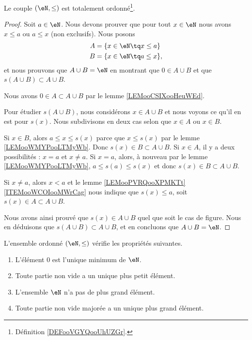 \begin{proposition}     \label{PROPooGCCRooFBYrlo}
	Le couple \( (\eN,\leq)\) est totalement ordonné\footnote{Définition \ref{DEFooVGYQooUhUZGr}.}.
\end{proposition}

\begin{proof}
	Soit \( a\in \eN\). Nous devons prouver que pour tout \( x\in \eN\) nous avons \( x\leq a\) ou \( a\leq x\) (non exclusifs). Nous posons
	\begin{subequations}
		\begin{align}
			A & =\{ x\in \eN\tq x\leq a \}  \\
			B & =\{ x\in \eN\tq a\leq x \},
		\end{align}
	\end{subequations}
	et nous prouvons que \( A\cup B=\eN\) en montrant que \( 0\in A\cup B\) et que \( s(A\cup B)\subset A\cup B\).

	Nous avons \( 0\in A\subset A\cup B\) par le lemme \ref{LEMooCSIXooHeuWEd}.

	Pour étudier \( s(A\cup B)\), nous considérons \( x\in A\cup B\) et nous voyons ce qu'il en est pour \( s(x) \). Nous subdivisons en deux cas selon que \( x\in A\) ou \( x\in B\).

	\begin{subproof}
		\spitem[Si \( x\in B\)]
		Si \( x\in B\), alors \( a\leq x\leq s(x)\) parce que \( x\leq s(x)\) par le lemme \ref{LEMooWMYPooLTMyWb}. Donc \( s(x)\in B\subset A\cup B\).
		\spitem[Si \( x\in A\)]
		Si \( x\in A\), il y a deux possibilités : \( x=a\) et \( x\neq a\). Si \( x=a\), alors, à nouveau par le lemme \ref{LEMooWMYPooLTMyWb}, \( a\leq s(a) \leq s(x) \) et donc \( s(x)\in B\subset A\cup B\).

		Si \( x\neq a\), alors \( x < a \) et le lemme \ref{LEMooPVRQooXPMKTt}\ref{ITEMooWCOIooMWrCag} nous indique que \( s(x)\leq a\), soit \( s(x)\in A\subset A\cup B\).
	\end{subproof}
	Nous avons ainsi prouvé que \( s(x) \in A \cup B \) quel que soit le cas de figure. Nous en déduisons que \( s(A\cup B)\subset A\cup B\), et en concluons que \( A\cup B=\eN\).
\end{proof}

\begin{proposition}     \label{PROPooMZOWooHmsXzI}
	L'ensemble ordonné \( (\eN,\leq)\) vérifie les propriétés suivantes.
	\begin{enumerate}
		\item       \label{ITEMooJLAHooDKukfH}
		      L'élément \( 0\) est l'unique minimum de \( \eN\).
		\item       \label{ITEMooYAJIooEFmOpB}
		      Toute partie non vide a un unique plus petit élément.
		\item       \label{ITEMooSRGOooNYJJHY}
		      L'ensemble \( \eN\) n'a pas de plus grand élément.
		\item       \label{ITEMooKIHZooDRTCdx}
		      Toute partie non vide majorée a un unique plus grand élément.
	\end{enumerate}
\end{proposition}

